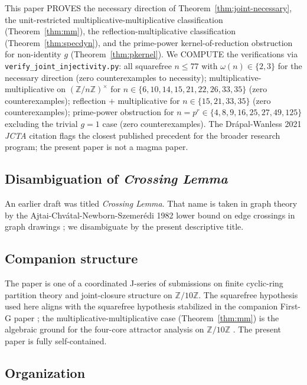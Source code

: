 \documentclass[11pt,reqno]{amsart}
\theoremstyle{plain}
\theoremstyle{definition}
\theoremstyle{remark}
\newcommand{\Z}{\mathbb{Z}}
\begin{document}
This paper PROVES the necessary direction of Theorem~\ref{thm:joint-necessary},
the unit-restricted multiplicative-multiplicative classification
(Theorem~\ref{thm:mm}), the reflection-multiplicative classification
(Theorem~\ref{thm:specdyn}), and the prime-power kernel-of-reduction
obstruction for non-identity $g$ (Theorem~\ref{thm:pkernel}). We
COMPUTE the verifications via \texttt{verify\_joint\_injectivity.py}:
all squarefree $n \le 77$ with $\omega(n) \in \{2, 3\}$ for the
necessary direction (zero counterexamples to necessity);
multiplicative-multiplicative on $(\Z/n\Z)^{\times}$ for $n \in \{6,
10, 14, 15, 21, 22, 26, 33, 35\}$ (zero counterexamples); reflection
$+$ multiplicative for $n \in \{15, 21, 33, 35\}$ (zero
counterexamples); prime-power obstruction for $n = p^{r} \in \{4, 8,
9, 16, 25, 27, 49, 125\}$ excluding the trivial $g = 1$ case (zero
counterexamples). The Drápal-Wanless 2021 \emph{JCTA} citation
\cite{DrapalWanless2021} flags the closest published precedent for
the broader research program; the present paper is not a magma paper.

\subsection{Disambiguation of \emph{Crossing Lemma}}

An earlier draft was titled \emph{Crossing Lemma}. That name is
taken in graph theory by the Ajtai-Chv\'atal-Newborn-Szemer\'edi 1982
lower bound on edge crossings in graph drawings
\cite{ACNS1982,LeightonRichterThomassen1997}; we disambiguate by the
present descriptive title.

\subsection{Companion structure}

The paper is one of a coordinated J-series of submissions on finite
cyclic-ring partition theory and joint-closure structure on $\Z/10\Z$.
The squarefree hypothesis used here aligns with the squarefree
hypothesis stabilized in the companion First-G paper
\cite{SandersGish2026FirstG}; the multiplicative-multiplicative
case (Theorem~\ref{thm:mm}) is the algebraic ground for the four-core
attractor analysis on $\Z/10\Z$ \cite{SandersGish2026FourCore}. The
present paper is fully self-contained.

\subsection{Organization}
\end{document}

